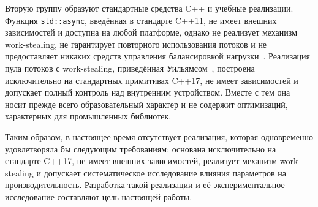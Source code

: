 Вторую группу образуют стандартные средства C++ и учебные
реализации. Функция \texttt{std::async}, введённая в стандарте
C++11, не имеет внешних зависимостей и доступна на любой платформе,
однако не реализует механизм work-stealing, не гарантирует повторного
использования потоков и не предоставляет никаких средств управления
балансировкой нагрузки~\cite{Williams2019}. Реализация пула потоков
с work-stealing, приведённая Уильямсом~\cite{Williams2019},
построена исключительно на стандартных примитивах C++17,
не имеет зависимостей и допускает полный контроль над внутренним
устройством. Вместе с тем она носит прежде всего образовательный
характер и не содержит оптимизаций, характерных для промышленных
библиотек.

Таким образом, в настоящее время отсутствует реализация, которая
одновременно удовлетворяла бы следующим требованиям: основана
исключительно на стандарте C++17, не имеет внешних зависимостей,
реализует механизм work-stealing и допускает систематическое
исследование влияния параметров на производительность. Разработка
такой реализации и её экспериментальное исследование составляют
цель настоящей работы.